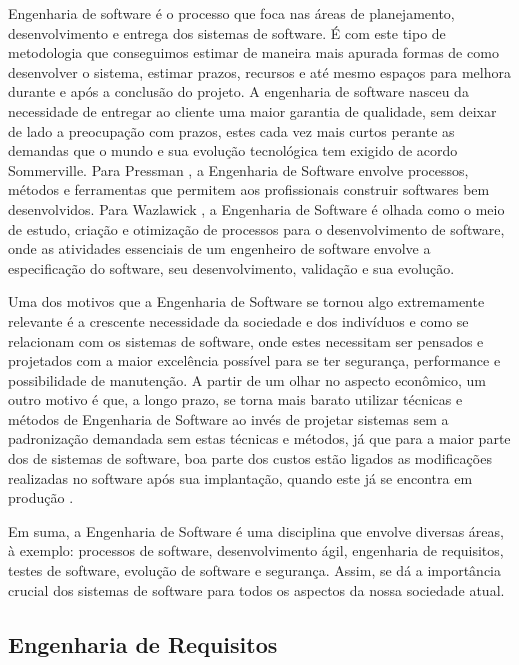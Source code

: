 Engenharia de software é o processo que foca nas áreas de planejamento, desenvolvimento e entrega dos sistemas de software. É com este tipo de metodologia que conseguimos estimar de maneira mais apurada formas de como desenvolver o sistema, estimar prazos, recursos e até mesmo espaços para melhora durante e após a conclusão do projeto. A engenharia de software nasceu da necessidade de entregar ao cliente uma maior garantia de qualidade, sem deixar de lado a preocupação com prazos, estes cada vez mais curtos perante as demandas que o mundo e sua evolução tecnológica tem exigido de acordo Sommerville\cite{Sommerville07}. Para Pressman \cite{pressman}, a Engenharia de Software envolve processos, métodos e ferramentas que permitem aos profissionais
construir softwares bem desenvolvidos. Para Wazlawick \cite{wazlawick}, a Engenharia de Software é olhada como o meio de estudo, criação e otimização de processos para o desenvolvimento de software, onde as atividades essenciais de um engenheiro de software envolve a especificação do software, seu desenvolvimento, validação e sua evolução.

Uma dos motivos que a Engenharia de Software se tornou algo extremamente relevante é a crescente necessidade da sociedade e dos indivíduos e como se relacionam com os sistemas de software, onde estes necessitam ser pensados e projetados com a maior excelência possível para se ter segurança, performance e possibilidade de manutenção. A partir de um olhar no aspecto econômico, um outro motivo é que, a longo prazo, se torna mais barato utilizar técnicas e métodos de Engenharia de Software ao invés de projetar sistemas sem a padronização demandada sem estas técnicas e métodos, já que para a maior parte dos de sistemas de software, boa parte dos custos estão ligados as modificações realizadas no software após sua implantação, quando este já se encontra em produção \cite{Sommerville07}.

Em suma, a Engenharia de Software é uma disciplina que envolve diversas áreas, à exemplo: processos de software, desenvolvimento ágil, engenharia de requisitos, testes
de software, evolução de software e segurança. Assim, se dá a importância crucial dos sistemas de software para todos os aspectos da nossa sociedade atual.

\subsection{Engenharia de Requisitos}

